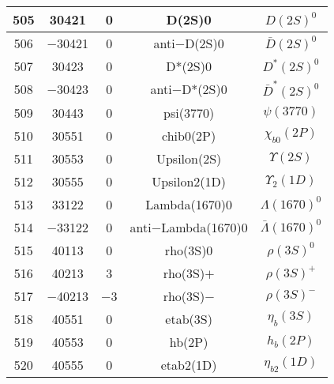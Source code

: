 \documentclass{article}
\begin{document}
\begin{table}[!htbp]
\begin{tabular}{|c|c|c|c|c|}
\hline
505 & 30421 & 0 & D(2S)0 & $D(2S)^{0}$ \\
\hline
506 & $-$30421 & 0 & anti$-$D(2S)0 & $\bar{D}(2S)^{0}$ \\
\hline
507 & 30423 & 0 & D*(2S)0 & $D^{*}(2S)^{0}$ \\
\hline
508 & $-$30423 & 0 & anti$-$D*(2S)0 & $\bar{D}^{*}(2S)^{0}$ \\
\hline
509 & 30443 & 0 & psi(3770) & $\psi(3770)$ \\
\hline
510 & 30551 & 0 & chi\underline{\hspace{0.6em}}b0(2P) & $\chi_{b0}(2P)$ \\
\hline
511 & 30553 & 0 & Upsilon(2S) & $\Upsilon(2S)$ \\
\hline
512 & 30555 & 0 & Upsilon\underline{\hspace{0.6em}}2(1D) & $\Upsilon_{2}(1D)$ \\
\hline
513 & 33122 & 0 & Lambda(1670)0 & $\Lambda(1670)^{0}$ \\
\hline
514 & $-$33122 & 0 & anti$-$Lambda(1670)0 & $\bar{\Lambda}(1670)^{0}$ \\
\hline
515 & 40113 & 0 & rho(3S)0 & $\rho(3S)^{0}$ \\
\hline
516 & 40213 & 3 & rho(3S)$+$ & $\rho(3S)^{+}$ \\
\hline
517 & $-$40213 & $-$3 & rho(3S)$-$ & $\rho(3S)^{-}$ \\
\hline
518 & 40551 & 0 & eta\underline{\hspace{0.6em}}b(3S) & $\eta_{b}(3S)$ \\
\hline
519 & 40553 & 0 & h\underline{\hspace{0.6em}}b(2P) & $h_{b}(2P)$ \\
\hline
520 & 40555 & 0 & eta\underline{\hspace{0.6em}}b2(1D) & $\eta_{b2}(1D)$ \\
\hline
\end{tabular}
\end{table}

\clearpage
\end{document}
